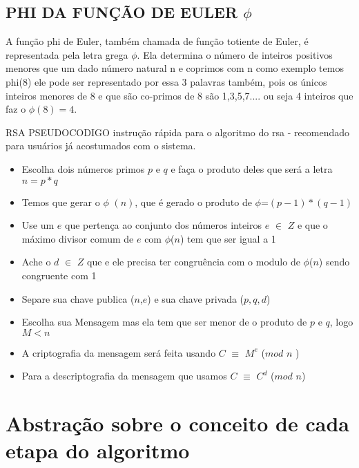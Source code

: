 \documentclass{article}
\begin{document}
\subsection{PHI DA FUNÇÃO DE EULER $\phi$}
A função phi de Euler, também chamada de função totiente de Euler, é representada pela letra grega $\phi$. Ela determina o número de inteiros positivos menores que um dado número natural n e coprimos com n como exemplo temos phi(8) ele pode ser representado por essa 3 palavras também, pois os únicos inteiros menores de 8 e que são co-primos de 8 são 1,3,5,7.... ou seja 4 inteiros que faz o $\phi(8)=4$.

\vspace{1cm}

\caption{RSA PSEUDOCODIGO instrução rápida para o algoritmo do rsa - recomendado para usuários já acostumados com o sistema.}
 \begin{itemize}
     \item Escolha dois números primos $p$ e $q$ e faça o produto deles que será a letra $n=p*q$
     \item  Temos que gerar o $\phi$ $(n)$, que é gerado o produto de $\phi$=$(p-1)*(q-1)$ 
     \item Use um $e$ que pertença ao conjunto dos números inteiros $e$ $\in$ $Z$ e que o máximo divisor comum de $e$ com $\phi$($n$) tem que ser igual a 1 
     \item Ache o $d$ $\in$ $Z$ que e ele precisa ter congruência com o modulo de $\phi$($n$) sendo congruente com 1
     \item Separe sua chave publica ($n$,$e$) e sua chave privada ($p,q,d$)
     \item Escolha sua Mensagem mas ela tem que ser menor de o produto de $p$  e  $q$, logo $M < n$
     \item A criptografia da mensagem será feita usando $C$ $\equiv$ $M^e$ ($mod$  $n$ ) 
     \item Para a descriptografia da mensagem que usamos $C$ $\equiv$ $C^d$ ($mod$  $n$)
 \end{itemize}
 


\section{Abstração sobre o conceito de cada etapa do algoritmo}
\end{document}
